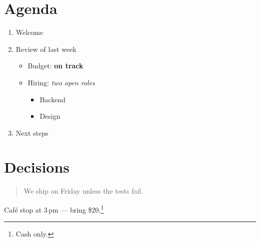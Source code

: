 \documentclass{article}
\begin{document}
\section{Agenda}
\begin{enumerate}
\item Welcome
\item Review of last week
  \begin{itemize}
  \item Budget: \textbf{on track}
  \item Hiring: \emph{two open roles}
    \begin{itemize}
    \item Backend
    \item Design
    \end{itemize}
  \end{itemize}
\item Next steps
\end{enumerate}
\section{Decisions}
\begin{quote}
We ship on Friday unless the tests fail.
\end{quote}
Caf\'e stop at 3\,pm --- bring \$20.\footnote{Cash only.}
\end{document}
